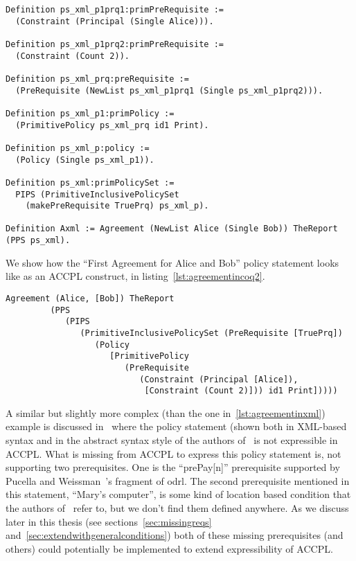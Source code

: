 \begin{minipage}[c]{0.95\textwidth}
\begin{lstlisting}
Definition ps_xml_p1prq1:primPreRequisite := 
  (Constraint (Principal (Single Alice))).

Definition ps_xml_p1prq2:primPreRequisite := 
  (Constraint (Count 2)).

Definition ps_xml_prq:preRequisite := 
  (PreRequisite (NewList ps_xml_p1prq1 (Single ps_xml_p1prq2))).

Definition ps_xml_p1:primPolicy := 
  (PrimitivePolicy ps_xml_prq id1 Print).

Definition ps_xml_p:policy := 
  (Policy (Single ps_xml_p1)).

Definition ps_xml:primPolicySet :=
  PIPS (PrimitiveInclusivePolicySet
    (makePreRequisite TruePrq) ps_xml_p).

Definition Axml := Agreement (NewList Alice (Single Bob)) TheReport (PPS ps_xml).
\end{lstlisting}
\end{minipage} 

We show how the ``First Agreement for Alice and Bob'' policy statement looks like as an \ac{ACCPL} construct, in listing~\ref{lst:agreementincoq2}.

\begin{minipage}[c]{0.95\textwidth}
\begin{lstlisting}
Agreement (Alice, [Bob]) TheReport
         (PPS
            (PIPS
               (PrimitiveInclusivePolicySet (PreRequisite [TruePrq])
                  (Policy
                     [PrimitivePolicy
                        (PreRequisite
                           (Constraint (Principal [Alice]),
                            [Constraint (Count 2)])) id1 Print]))))

\end{lstlisting}
\end{minipage} 

A similar but slightly more complex (than the one in~\ref{lst:agreementinxml}) example is discussed in~\cite{pucella2006} where the policy statement (shown both in XML-based syntax and in the abstract syntax style of the authors of~\cite{pucella2006} is not expressible in \ac{ACCPL}. What is missing from \ac{ACCPL} to express this policy statement is, not supporting two prerequisites. One is the ``prePay[n]'' prerequisite supported by Pucella and Weissman~\cite{pucella2006}'s fragment of \ac{odrl}. The second prerequisite mentioned in this statement, ``Mary's computer'', is some kind of location based condition that the authors of~\cite{pucella2006} refer to, but we don't find them defined anywhere. As we discuss later in this thesis (see sections~\ref{sec:missingreqs} and~\ref{sec:extendwithgeneralconditions}) both of these missing prerequisites (and others) could potentially be implemented to extend expressibility of \ac{ACCPL}.

